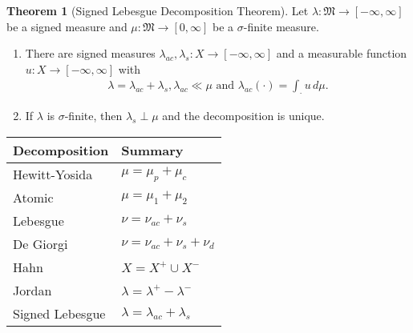 \documentclass[10pt, leqno]{amsart}
\theoremstyle{definition}
\newtheorem{theorem}{Theorem}[section]
\theoremstyle{remark}
\begin{document}
    \begin{theorem}[Signed Lebesgue Decomposition Theorem]
        Let \(\lambda\colon \mathfrak{M} \to [-\infty, \infty]\) be a signed measure and \(\mu\colon \mathfrak{M} \to [0, \infty]\) be a \(\sigma\)-finite measure.
        \begin{enumerate}[label=(\roman*), wide]
            \item \label{thm:lebesgue_decomposition_thm_1} There are signed measures \(\lambda_{ac}, \lambda_s\colon X \to [-\infty, \infty]\) and a measurable function \(u\colon X \to [-\infty, \infty]\) with
            \begin{align}
                \lambda = \lambda_{ac} + \lambda_s, \lambda_{ac} \ll \mu \text{ and } \lambda_{ac}(\cdot) = \int_{\cdot} u \, d\mu.
            \end{align}
            \item \label{thm:lebesgue_decomposition_thm_2} If \(\lambda\) is \(\sigma\)-finite, then \(\lambda_s \perp \mu\) and the decomposition is unique.
        \end{enumerate}
    \end{theorem}

    \begin{minipage}{\linewidth}
        \centering
        \begin{tabular}{C{4cm}|C{3cm}}
            Decomposition & Summary \\\hline
            Hewitt-Yosida \cite[pp. 8-9]{Fonseca} & \(\mu = \mu_p + \mu_c\)\\
            Atomic \cite[pp. 13-16]{Fonseca} & \(\mu = \mu_1 + \mu_2\)\\
            Lebesgue & \(\nu = \nu_{ac} + \nu_s\)\\
            De Giorgi & \(\nu = \nu_{ac} + \nu_s + \nu_d\)\\
            Hahn & \(X = X^+ \cup X^-\)\\
            Jordan & \(\lambda = \lambda^+ - \lambda^-\)\\
            Signed Lebesgue & \(\lambda = \lambda_{ac} + \lambda_s\)
        \end{tabular}
    \end{minipage}

    \printbibliography{}
\end{document}
